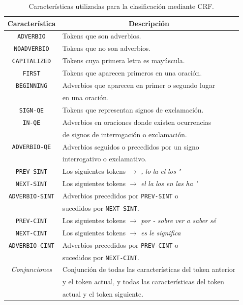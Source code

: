 \documentclass[runningheads,a4paper]{llncs}
\begin{document}
\begin{table}[ht]
 	\renewcommand{\arraystretch}{1.3}
	\renewcommand{\tabcolsep}{3pt}
	\caption{Características utilizadas para la clasificación mediante CRF.}
	\label{table:featuresCRF}
	\centering
	\begin{tabular}{c l}
		\hline\hline
		\multicolumn{1}{c}{\textbf{Característica}} & \multicolumn{1}{c}{\textbf{Descripción}} \\
		\hline
		\texttt{ADVERBIO} & Tokens que son adverbios. \\
		\texttt{NOADVERBIO} & Tokens que no son adverbios. \\
		\texttt{CAPITALIZED} & Tokens cuya primera letra es mayúscula. \\
		\texttt{FIRST} & Tokens que aparecen primeros en una oración. \\
		\texttt{BEGINNING} & Adverbios que aparecen en primer o segundo lugar \\
		& en una oración. \\
		\texttt{SIGN-QE} & Tokens que representan signos de exclamación. \\
		\texttt{IN-QE} & Adverbios en oraciones donde existen ocurrencias \\
		& de signos de interrogación o exclamación. \\
		\texttt{ADVERBIO-QE} & Adverbios seguidos o precedidos por un signo \\
		& interrogativo o exclamativo. \\
		\texttt{PREV-SINT} & Los siguientes tokens $\rightarrow$ \emph{,} \emph{lo} \emph{la} \emph{el} \emph{los} \emph{"} \\
		\texttt{NEXT-SINT} & Los siguientes tokens $\rightarrow$ \emph{el} \emph{la} \emph{los} \emph{en} \emph{las} \emph{ha} \emph{"} \\
		\texttt{ADVERBIO-SINT} & Adverbios precedidos por \texttt{PREV-SINT} o \\
		& sucedidos por \texttt{NEXT-SINT}. \\
		\texttt{PREV-CINT} & Los siguientes tokens $\rightarrow$ \emph{por} \emph{-} \emph{sobre} \emph{ver} \emph{a} \emph{saber} \emph{sé} \\
		\texttt{NEXT-CINT} & Los siguientes tokens $\rightarrow$ \emph{es} \emph{le} \emph{significa} \\
		\texttt{ADVERBIO-CINT} & Adverbios precedidos por \texttt{PREV-CINT} o \\
		& sucedidos por \texttt{NEXT-CINT}. \\
		\emph{Conjunciones} & Conjunción de todas las características del token anterior \\
		& y el token actual, y todas las características del token \\
		& actual y el token siguiente. \\
		\hline
	\end{tabular}
\end{table}
\end{document}
